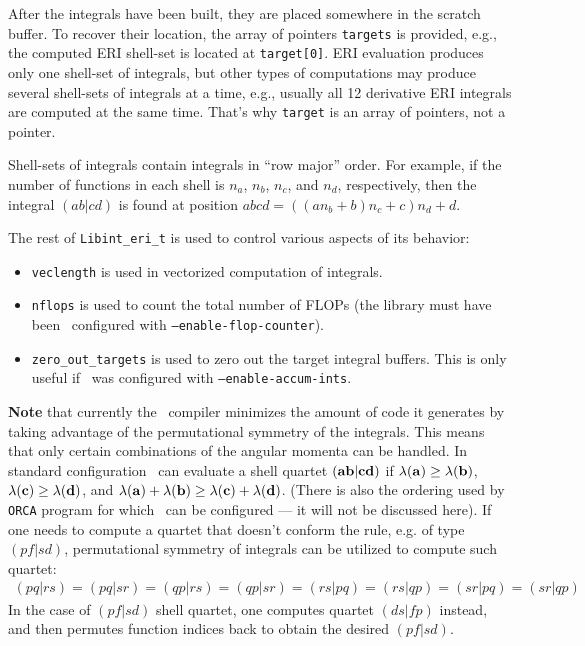 \documentclass[10pt]{article}
\begin{document}
After the integrals have been built, they are placed somewhere in the scratch buffer.
To recover their location, the array of pointers {\tt targets} is provided, e.g.,
the computed ERI shell-set is located at {\tt target[0]}.
ERI evaluation produces only one shell-set of integrals, but other types of computations
may produce several shell-sets of integrals at a time, e.g., usually all 12 derivative
ERI integrals are computed at the same time. That's why {\tt target} is an array of pointers, not a pointer.

Shell-sets of integrals contain integrals in ``row major'' order.\cite{KnuthACP} For example, if
the number of functions in each shell is $n_a$, $n_b$, $n_c$, and $n_d$, respectively,
then the integral $(ab|cd)$ is found at position $abcd = ( (a n_b + b) n_c + c) n_d + d$.

The rest of {\tt Libint\_eri\_t} is used to control various aspects of its behavior:
\begin{itemize}
\item {\tt veclength} is used in vectorized computation of integrals.
\item {\tt nflops} is used to count the total number of FLOPs (the library must have been \
configured with {\tt --enable-flop-counter}).
\item {\tt zero\_out\_targets} is used to zero out the target integral buffers. This is only useful
  if \LIBINT\ was configured with {\tt --enable-accum-ints}.
\end{itemize}

{\bf Note} that currently the \LIBINT\ compiler minimizes the amount of code it
generates by taking advantage of the permutational symmetry of the integrals.
This means that only certain combinations of the angular momenta can be handled.
In standard configuration \LIBINT\ can evaluate a shell quartet $({\bf ab}|{\bf cd})$ if $\lambda({\bf a}) \geq \lambda({\bf b})$, $\lambda({\bf c}) \geq \lambda({\bf d})$, and $\lambda({\bf a}) + \lambda({\bf b}) \geq \lambda({\bf c}) + \lambda({\bf d})$.
(There is also the ordering used by {\tt ORCA} program for which \LIBINT\ can be
configured --- it will not be discussed here). If one needs to compute a quartet that doesn't conform the rule,
e.g. of type $(pf|sd)$, permutational symmetry of integrals can be utilized to compute such quartet:
\begin{eqnarray}
(pq|rs) = (pq|sr) = (qp|rs) = (qp|sr) = (rs|pq) = (rs|qp)= (sr|pq) = (sr|qp)
\end{eqnarray}
In the case of $(pf|sd)$ shell quartet, one computes quartet $(ds|fp)$ instead, and then
permutes function indices back to obtain the desired $(pf|sd)$.
\end{document}
